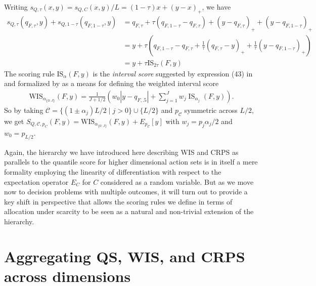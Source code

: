 \documentclass{article}
\begin{document}
Writing $s_{Q,\tau}(x,y) = s_{Q,C}(x,y)/L = (1-\tau)x + (y-x)_{+}$, we have
\begin{align}
s_{Q,\tau}(q_{F,\tau},y) + s_{Q,1-\tau}(q_{F,1-\tau},y) &= q_{F,\tau} + \tau(q_{F,1-\tau} - q_{F,\tau}) + (y - q_{F,\tau})_{+} + (y - q_{F,1-\tau})_{+} \\
&= y + \tau\left(q_{F,1-\tau} - q_{F,\tau} + \frac{1}{\tau}(q_{F,\tau} - y)_{+} + \frac{1}{\tau}(y - q_{F,1-\tau})_{+}\right) \\
&= y + \tau \mathrm{IS}_{2\tau}(F,y)
\end{align}
The scoring rule $\mathrm{IS}_{\alpha}(F,y)$ is the \emph{interval score} suggested by expression (43) in \cite{gneiting2007strictly} 
and formalized by \cite{bracher2021evaluating} as a means for defining the weighted interval score 
\begin{align}
\mathrm{WIS}_{\alpha_{\{0: J\}}}(F, y)=\frac{1}{J+1 / 2}\left(w_0 |y-q_{F,.5}|+\sum_{j=1}^J w_j \operatorname{IS}_{\alpha_j}(F, y)\right).
\end{align}
So by taking $\mathcal{C} = \{(1 \pm \alpha_j)L/2 \mid j > 0\}\cup \{L/2\}$ and $p_\mathcal{C}$ symmetric across $L/2$, we get 
$S_{Q,\mathcal{C}, p_C}(F,y) = \mathrm{WIS}_{\alpha_{\{0: J\}}}(F, y) + E_{p_{\mathcal{C}}}[y]$ with $w_j = p_{j}\alpha_j/2$ and $w_0 = p_{L/2}$.


Again, the hierarchy we have introduced here describing WIS and CRPS as parallels to the quantile score for higher dimensional action sets is in itself a mere formality employing the linearity of differentiation with respect to the expectation operator $E_{C}$ for $C$ considered as a random variable. But as we move now to decision problems with multiple outcomes, it will turn out to provide a key shift in perspective that allows the scoring rules we define in terms of allocation under scarcity to be seen as a natural and non-trivial extension of the hierarchy. 


\section{Aggregating QS, WIS, and CRPS across dimensions}
\end{document}
